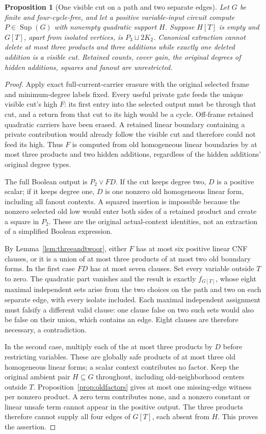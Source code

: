 \documentclass[11pt]{article}
\newcommand{\Sup}{\operatorname{Sup}}
\newtheorem{proposition}[theorem]{Proposition}
\theoremstyle{definition}
\theoremstyle{remark}
\begin{document}
\begin{proposition}[One visible cut on a path and two separate edges]\label{prop:onevisiblepath}
Let $G$ be finite and four-cycle-free, and let a positive variable-input circuit compute $P\in\Sup(G)$ with nonempty quadratic support $H$. Suppose $H[T]$ is empty and $G[T]$, apart from isolated vertices, is $P_3\sqcup2K_2$. Canonical extraction cannot delete at most three products and three additions while exactly one deleted addition is a visible cut. Retained counts, cover gain, the original degrees of hidden additions, squares and fanout are unrestricted.
\end{proposition}
\begin{proof}
Apply exact full-current-carrier erasure with the original selected frame and minimum-degree labels fixed. Every useful private gate feeds the unique visible cut's high $F$: its first entry into the selected output must be through that cut, and a return from that cut to its high would be a cycle. Off-frame retained quadratic carriers have been erased. A retained linear boundary containing a private contribution would already follow the visible cut and therefore could not feed its high. Thus $F$ is computed from old homogeneous linear boundaries by at most three products and two hidden additions, regardless of the hidden additions' original degree types.

The full Boolean output is $P_2\vee FD$. If the cut keeps degree two, $D$ is a positive scalar; if it keeps degree one, $D$ is one nonzero old homogeneous linear form, including all fanout contexts. A squared insertion is impossible because the nonzero selected old low would enter both sides of a retained product and create a square in $P_2$. These are the original actual-context identities, not an extraction of a simplified Boolean expression.

By Lemma~\ref{lem:threeandtwoor}, either $F$ has at most six positive linear CNF clauses, or it is a union of at most three products of at most two old boundary forms. In the first case $FD$ has at most seven clauses. Set every variable outside $T$ to zero. The quadratic part vanishes and the result is exactly $f_{G[T]}$, whose eight maximal independent sets arise from the two choices on the path and two on each separate edge, with every isolate included. Each maximal independent assignment must falsify a different valid clause: one clause false on two such sets would also be false on their union, which contains an edge. Eight clauses are therefore necessary, a contradiction.

In the second case, multiply each of the at most three products by $D$ before restricting variables. These are globally safe products of at most three old homogeneous linear forms; a scalar context contributes no factor. Keep the original ambient pair $H\subseteq G$ throughout, including old-neighborhood centers outside $T$. Proposition~\ref{prop:oldfactors} gives at most one missing-edge witness per nonzero product. A zero term contributes none, and a nonzero constant or linear unsafe term cannot appear in the positive output. The three products therefore cannot supply all four edges of $G[T]$, each absent from $H$. This proves the assertion.
\end{proof}
\end{document}
